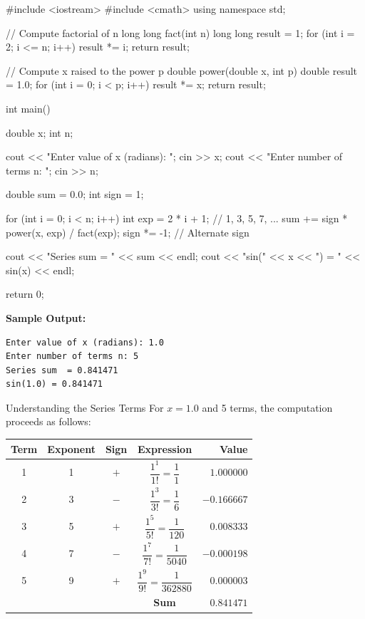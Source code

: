 \begin{cppcode}
#include <iostream>
#include <cmath>
using namespace std;

// Compute factorial of n
long long fact(int n)
{
    long long result = 1;
    for (int i = 2; i <= n; i++)
        result *= i;
    return result;
}

// Compute x raised to the power p
double power(double x, int p)
{
    double result = 1.0;
    for (int i = 0; i < p; i++)
        result *= x;
    return result;
}

int main()
{
    double x;
    int n;

    cout << "Enter value of x (radians): ";
    cin >> x;
    cout << "Enter number of terms n: ";
    cin >> n;

    double sum = 0.0;
    int sign = 1;

    for (int i = 0; i < n; i++)
    {
        int exp = 2 * i + 1;  // 1, 3, 5, 7, ...
        sum += sign * power(x, exp) / fact(exp);
        sign *= -1;            // Alternate sign
    }

    cout << "Series sum  = " << sum << endl;
    cout << "sin(" << x << ") = " << sin(x) << endl;

    return 0;
}
\end{cppcode}

\noindent\textbf{Sample Output:}
\begin{verbatim}
Enter value of x (radians): 1.0
Enter number of terms n: 5
Series sum  = 0.841471
sin(1.0) = 0.841471
\end{verbatim}

\begin{infobox}{Understanding the Series Terms}
For $x = 1.0$ and 5 terms, the computation proceeds as follows:

\begin{center}
\renewcommand{\arraystretch}{1.3}
\begin{tabular}{@{}ccccr@{}}
\toprule
\textbf{Term} & \textbf{Exponent}
    & \textbf{Sign} & \textbf{Expression}
    & \textbf{Value} \\
\midrule
1 & 1 & $+$ & $\dfrac{1^{1}}{1!} = \dfrac{1}{1}$
    & $1.000000$ \\[6pt]
2 & 3 & $-$ & $\dfrac{1^{3}}{3!} = \dfrac{1}{6}$
    & $-0.166667$ \\[6pt]
3 & 5 & $+$ & $\dfrac{1^{5}}{5!} = \dfrac{1}{120}$
    & $0.008333$ \\[6pt]
4 & 7 & $-$ & $\dfrac{1^{7}}{7!} = \dfrac{1}{5040}$
    & $-0.000198$ \\[6pt]
5 & 9 & $+$ & $\dfrac{1^{9}}{9!} = \dfrac{1}{362880}$
    & $0.000003$ \\
\midrule
  &   &     & \textbf{Sum}
    & $\mathbf{0.841471}$ \\
\bottomrule
\end{tabular}
\end{center}
\end{infobox}

